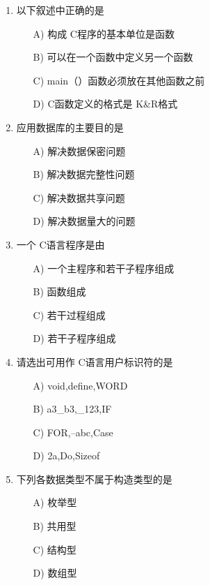 \documentclass[12pt,a4paper]{article}
\begin{document}
\begin{enumerate}
    \item 以下叙述中正确的是
    \begin{enumerate}
        \item[A)] 构成 C程序的基本单位是函数
        \item[B)] 可以在一个函数中定义另一个函数
        \item[C)] main（）函数必须放在其他函数之前
        \item[D)] C函数定义的格式是 K\&R格式
    \end{enumerate}
    
    \item 应用数据库的主要目的是
    \begin{enumerate}
        \item[A)] 解决数据保密问题
        \item[B)] 解决数据完整性问题
        \item[C)] 解决数据共享问题
        \item[D)] 解决数据量大的问题
    \end{enumerate}
    
    \item 一个 C语言程序是由
    \begin{enumerate}
        \item[A)] 一个主程序和若干子程序组成
        \item[B)] 函数组成
        \item[C)] 若干过程组成
        \item[D)] 若干子程序组成
    \end{enumerate}
    
    \item 请选出可用作 C语言用户标识符的是
    \begin{enumerate}
        \item[A)] void,define,WORD
        \item[B)] a3\_b3,\_123,IF
        \item[C)] FOR,--abc,Case
        \item[D)] 2a,Do,Sizeof
    \end{enumerate}
    
    \item 下列各数据类型不属于构造类型的是
    \begin{enumerate}
        \item[A)] 枚举型
        \item[B)] 共用型
        \item[C)] 结构型
        \item[D)] 数组型
    \end{enumerate}
    

\end{enumerate}
\end{document}

